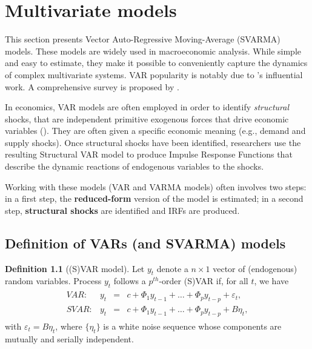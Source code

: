 \documentclass[
  12pt,
]{book}
\theoremstyle{definition}
\newtheorem{definition}{Definition}[chapter]
\theoremstyle{definition}
\theoremstyle{definition}
\theoremstyle{definition}
\theoremstyle{remark}
\begin{document}
\hypertarget{VAR}{%
\chapter{Multivariate models}\label{VAR}}

This section presents Vector Auto-Regressive Moving-Average (SVARMA) models. These models are widely used in macroeconomic analysis. While simple and easy to estimate, they make it possible to conveniently capture the dynamics of complex multivariate systems. VAR popularity is notably due to \citet{Sims_1980}'s influential work. A comprehensive survey is proposed by \citet{Stock_Watson_2016}.

In economics, VAR models are often employed in order to identify \emph{structural} shocks, that are independent primitive exogenous forces that drive economic variables (\citet{Ramey_2016_NBER}). They are often given a specific economic meaning (e.g., demand and supply shocks). Once structural shocks have been identified, researchers use the resulting Structural VAR model to produce Impulse Response Functions that describe the dynamic reactions of endogenous variables to the shocks.

Working with these models (VAR and VARMA models) often involves two steps: in a first step, the \textbf{reduced-form} version of the model is estimated; in a second step, \textbf{structural shocks} are identified and IRFs are produced.

\hypertarget{definition-of-vars-and-svarma-models}{%
\section{Definition of VARs (and SVARMA) models}\label{definition-of-vars-and-svarma-models}}

\begin{definition}[(S)VAR model]
\protect\hypertarget{def:SVAR}{}\label{def:SVAR}Let \(y_{t}\) denote a \(n \times1\) vector of (endogenous) random variables. Process \(y_{t}\) follows a \(p^{th}\)-order (S)VAR if, for all \(t\), we have
\begin{eqnarray}
\begin{array}{rllll}
VAR:& y_t &=& c + \Phi_1 y_{t-1} + \dots + \Phi_p y_{t-p} + \varepsilon_t,\\
SVAR:& y_t &=& c + \Phi_1 y_{t-1} + \dots + \Phi_p y_{t-p} + B \eta_t,
\end{array}\label{eq:yVAR}
\end{eqnarray}
with \(\varepsilon_t = B\eta_t\), where \(\{\eta_{t}\}\) is a white noise sequence whose components are mutually and serially independent.
\end{definition}
\end{document}
